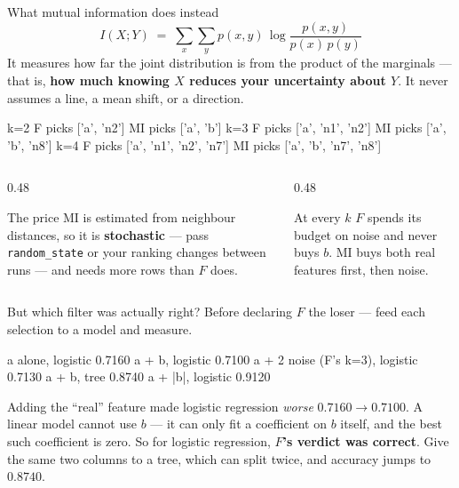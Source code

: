 \documentclass[aspectratio=169]{beamer}
\begin{document}
\begin{frame}[fragile,shrink=6]{What mutual information does instead}
\[
  I(X; Y) \;=\; \sum_{x}\sum_{y} p(x,y)\,
  \log\frac{p(x,y)}{p(x)\,p(y)}
\]
It measures how far the joint distribution is from the product of the
marginals --- that is, \textbf{how much knowing $X$ reduces your uncertainty
about $Y$}. It never assumes a line, a mean shift, or a direction.
\begin{outblk}
k=2   F picks ['a', 'n2']                MI picks ['a', 'b']
k=3   F picks ['a', 'n1', 'n2']          MI picks ['a', 'b', 'n8']
k=4   F picks ['a', 'n1', 'n2', 'n7']    MI picks ['a', 'b', 'n7', 'n8']
\end{outblk}
\begin{columns}[T]
  \begin{column}{0.48\textwidth}
    \begin{block}{The price}
      \small MI is estimated from neighbour distances, so it is
      \textbf{stochastic} --- pass \texttt{random\_state} or your ranking
      changes between runs --- and needs more rows than $F$ does.
    \end{block}
  \end{column}
  \begin{column}{0.48\textwidth}
    \begin{alertblock}{At every $k$}
      \small $F$ spends its budget on noise and never buys $b$. MI buys both
      real features first, then noise.
    \end{alertblock}
  \end{column}
\end{columns}
\end{frame}

\begin{frame}[fragile,shrink=8]{But which filter was actually right?}
Before declaring $F$ the loser --- feed each selection to a model and measure.
\begin{outblk}
a alone,                logistic       0.7160
a + b,                  logistic       0.7100
a + 2 noise (F's k=3),  logistic       0.7130
a + b,                  tree           0.8740
a + |b|,                logistic       0.9120
\end{outblk}
\begin{alertblock}{Adding the ``real'' feature made logistic regression
  \emph{worse}}
  \footnotesize $0.7160 \rightarrow 0.7100$. A linear model cannot use $b$ ---
  it can only fit a coefficient on $b$ itself, and the best such coefficient
  is zero. So for logistic regression, \textbf{$F$'s verdict was correct}. Give
  the same two columns to a tree, which can split twice, and accuracy jumps to
  $0.8740$.
\end{alertblock}
\end{frame}
\end{document}
